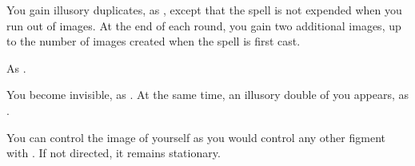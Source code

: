 \begin{spellheader}
    \begin{spelltargetinginfo}
    \end{spelltargetinginfo}
\end{spellheader}
\begin{spellcontent}
    \begin{spelleffects}
        \spelleffect You gain illusory duplicates, as , except that the spell is not expended when you run out of images. At the end of each round, you gain two additional images, up to the number of images created when the spell is first cast.
        \spelldur{\durshort \dismissable}
    \end{spelleffects}
\end{spellcontent}
\begin{spellfooter}
    \spellnotes As .
\end{spellfooter}

\begin{spellheader}
    \begin{spelltargetinginfo}
    \end{spelltargetinginfo}
\end{spellheader}
\begin{spellcontent}
    \begin{spelleffects}
        \spelleffect You become invisible, as . At the same time, an illusory double of you appears, as .

        You can control the image of yourself as you would control any other figment with . If not directed, it remains stationary.
        \spelldur{\durshort \dismissable}
    \end{spelleffects}
\end{spellcontent}
\begin{spellfooter}

\end{spellfooter}

